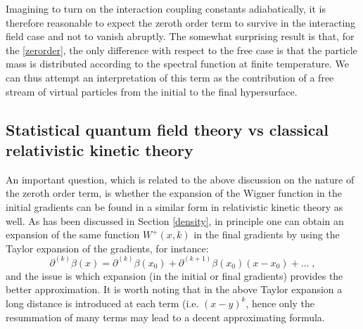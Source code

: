 \documentclass[prd,superscriptaddress,nofootinbib,notitlepage]{revtex4-1}
\begin{document}
Imagining to turn on the interaction coupling constants adiabatically, it is therefore reasonable to expect 
the zeroth order term to survive in the interacting field case and not to vanish abruptly. The somewhat 
surprising result is that, for the \eqref{zerorder}, the only difference with respect to the free case is that the 
particle mass is distributed according to the spectral function at finite temperature. We can thus attempt an 
interpretation of this term as the contribution of a free stream of virtual particles from the initial to the final 
hypersurface.

\subsection{Statistical quantum field theory vs classical relativistic kinetic theory}

An important question, which is related to the above discussion on the nature of the zeroth order term, is whether the 
expansion of the Wigner function in the initial gradients can be found in a similar form in relativistic kinetic theory 
as well. As has been discussed in Section \ref{density}, in principle one can obtain an expansion of the same function 
$W^+(x,k)$ in the final gradients by using the Taylor expansion of the gradients, for instance:
%
$$
\partial^{(k)} \beta (x)= \partial^{(k)} \beta(x_0) + \partial^{(k+1)} \beta(x_0) (x-x_0) + \ldots\;,
$$
%
and the issue is which expansion (in the initial or final gradients) provides the better approximation. It is worth noting 
that in the above Taylor expansion a long distance is introduced at each term (i.e. $(x-y)^k$, hence only the resummation of 
many terms may lead to a decent approximating formula.
\end{document}
